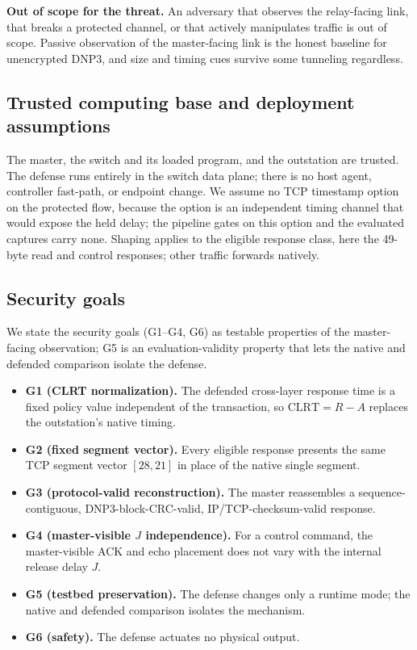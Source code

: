 \textbf{Out of scope for the threat.} An adversary that observes the relay-facing link, that breaks a
protected channel, or that actively manipulates traffic is out of scope. Passive observation of the
master-facing link is the honest baseline for unencrypted DNP3, and size and timing cues survive some
tunneling regardless.

\subsection{Trusted computing base and deployment assumptions}
The master, the switch and its loaded program, and the outstation are trusted. The defense runs
entirely in the switch data plane; there is no host agent, controller fast-path, or endpoint change.
We assume no TCP timestamp option on the protected flow, because the option is an independent timing
channel that would expose the held delay; the pipeline gates on this option and the evaluated
captures carry none. Shaping applies to the eligible response class, here the 49-byte read and control
responses; other traffic forwards natively.

\subsection{Security goals}
We state the security goals (G1--G4, G6) as testable properties of the master-facing observation;
G5 is an evaluation-validity property that lets the native and defended comparison isolate the defense.
\begin{itemize}
\item \textbf{G1 (CLRT normalization).} The defended cross-layer response time is a fixed policy value
independent of the transaction, so $\mathrm{CLRT}=R-A$ replaces the outstation's native timing.
\item \textbf{G2 (fixed segment vector).} Every eligible response presents the same TCP segment
vector $[28,21]$ in place of the native single segment.
\item \textbf{G3 (protocol-valid reconstruction).} The master reassembles a sequence-contiguous,
DNP3-block-CRC-valid, IP/TCP-checksum-valid response.
\item \textbf{G4 (master-visible $J$ independence).} For a control command, the master-visible ACK and
echo placement does not vary with the internal release delay $J$.
\item \textbf{G5 (testbed preservation).} The defense changes only a runtime mode; the native and
defended comparison isolates the mechanism.
\item \textbf{G6 (safety).} The defense actuates no physical output.
\end{itemize}

